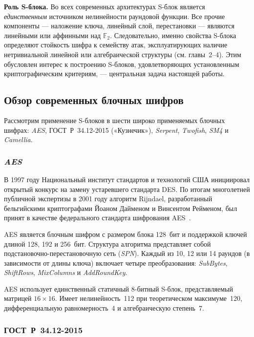 \textbf{Роль S-блока.} Во всех современных архитектурах S-блок является
\emph{единственным} источником нелинейности раундовой функции. Все
прочие компоненты — наложение ключа, линейный слой, перестановки —
являются линейными или аффинными над $\mathbb{F}_2$. Следовательно,
именно свойства S-блока определяют стойкость шифра к семейству атак,
эксплуатирующих наличие нетривиальной линейной или алгебраической
структуры (см. главы~2–4). Этим обусловлен интерес к построению
S-блоков, удовлетворяющих установленным криптографическим критериям, —
центральная задача настоящей работы.

\subsection{Обзор современных блочных шифров}
\indent Рассмотрим применение S-блоков в шести широко
применяемых блочных шифрах: \textit{AES}, ГОСТ~Р~34.12-2015 («Кузнечик»), \textit{Serpent},
\textit{Twofish}, \textit{SM4} и \textit{Camellia}.

\subsubsection{\textit{AES}}

В 1997 году Национальный институт стандартов и технологий США
инициировал открытый конкурс на замену устаревшего стандарта DES.
По итогам многолетней публичной экспертизы в 2001 году алгоритм Rijndael,
разработанный бельгийскими криптографами Йоаном Дайменом
и Винсентом Рейменом, был принят в качестве федерального
стандарта шифрования AES~\cite{fips197}.

AES является блочным шифром с размером блока 128~бит и поддержкой ключей
длиной 128, 192 и 256~бит. Структура алгоритма представляет собой
подстановочно-перестановочную сеть (\textit{SPN}). Каждый из 10, 12 или 14 раундов
(в зависимости от длины ключа) включает четыре преобразования:
\textit{SubBytes}, \textit{ShiftRows}, \textit{MixColumns} и \textit{AddRoundKey}.

AES использует единственный статичный 8-битный S-блок, представляемый
матрицей $16 \times 16$. Имеет нелинейность~112 при теоретическом максимуме~120, дифференциальную
равномерность~4 и алгебраическую степень~7.

\subsubsection{ГОСТ~Р~34.12-2015}

